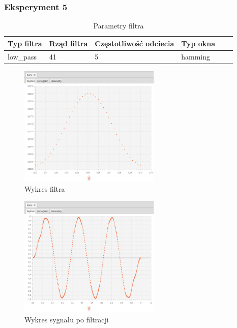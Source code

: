 \documentclass[12pt]{article}
\begin{document}
{{            \subsubsection{Eksperyment 5} {
                \begin{table}[H]
                \centering
                \begin{tabular}{|l|l|l|l|l|l|}
                \hline
                Typ filtra & Rząd filtra & Częstotliwość odciecia & Typ okna  \\\hline
                low\_pass & 41 & 5 & hamming     \\\hline
                \end{tabular}
                \caption{Parametry filtra}
                \end{table}
                \begin{figure}[H]
                \centering
                \includegraphics[width=0.6\textwidth]{img/result/filter/experiment05/data_draw_2a_filter_data_114000.png}
                \caption{Wykres filtra}
                \end{figure}

                \begin{figure}[H]
                \centering
                \includegraphics[width=0.6\textwidth]{img/result/filter/experiment05/data_draw_2a_result_data_114003.png}
                \caption{Wykres sygnału po filtracji}
                \end{figure}
            }
            \newpage

}}
\end{document}
